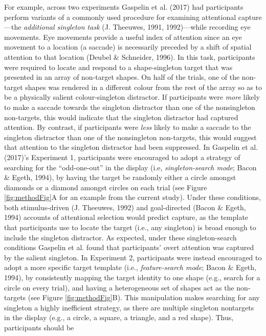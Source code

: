 \documentclass[jou, a4paper, noextraspace,floatsintext]{apa6}
\theoremstyle{definition}
\theoremstyle{definition}
\theoremstyle{definition}
\theoremstyle{remark}
\begin{document}
For example, across two experiments Gaspelin et al. (2017) had
participants perform variants of a commonly used procedure for examining
attentional capture---the \emph{additional singleton task} (J. Theeuwes,
1991, 1992)---while recording eye movements. Eye movements provide a
useful index of attention since an eye movement to a location (a
saccade) is necessarily preceded by a shift of spatial attention to that
location (Deubel \& Schneider, 1996). In this task, participants were
required to locate and respond to a shape-singleton target that was
presented in an array of non-target shapes. On half of the trials, one
of the non-target shapes was rendered in a different colour from the
rest of the array so as to be a physically salient colour-singleton
distractor. If participants were \emph{more} likely to make a saccade
towards the singleton distractor than one of the nonsingleton
non-targets, this would indicate that the singleton distractor had
captured attention. By contrast, if participants were \emph{less} likely
to make a saccade to the singleton distractor than one of the
nonsingleton non-targets, this would suggest that attention to the
singleton distractor had been suppressed. In Gaspelin et al. (2017)'s
Experiment 1, participants were encouraged to adopt a strategy of
searching for the \enquote{odd-one-out} in the display (i.e,
\emph{singleton-search mode}; Bacon \& Egeth, 1994), by having the
target be randomly either a circle amongst diamonds or a diamond amongst
circles on each trial (see Figure \ref{fig:methodFig}A for an example
from the current study). Under these conditions, both stimulus-driven
(J. Theeuwes, 1992) and goal-directed (Bacon \& Egeth, 1994) accounts of
attentional selection would predict capture, as the template that
participants use to locate the target (i.e., any singleton) is broad
enough to include the singleton distractor. As expected, under these
singleton-search conditions Gaspelin et al. found that participants'
overt attention was captured by the salient singleton. In Experiment 2,
participants were instead encouraged to adopt a more specific target
template (i.e., \emph{feature-search mode}; Bacon \& Egeth, 1994), by
consistently mapping the target identity to one shape (e.g., search for
a circle on every trial), and having a heterogeneous set of shapes act
as the non-targets (see Figure \ref{fig:methodFig}B). This manipulation
makes searching for any singleton a highly inefficient strategy, as
there are multiple singleton nontargets in the display (e.g., a circle,
a square, a triangle, and a red shape). Thus, participants should be
\end{document}
